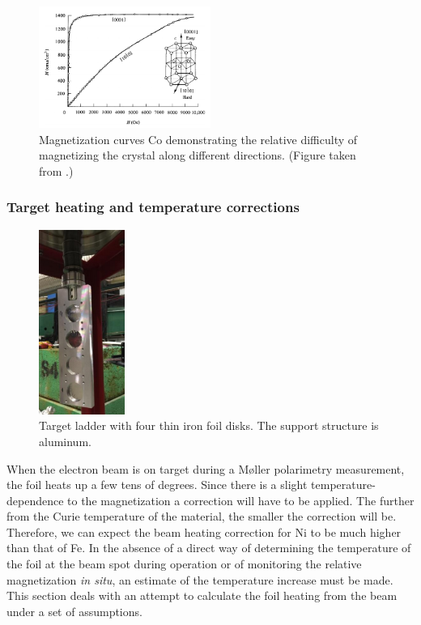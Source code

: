 \documentclass[12pt]{article}
\begin{document}
\begin{figure}[ht]
\centering
\includegraphics[width=0.5\textwidth]{anisotropy_Co.png}
\caption{Magnetization curves Co demonstrating the relative difficulty of magnetizing the crystal along different directions. (Figure taken from \cite{Cullity2008}.)}
\label{fig:anisotropy_Co}
\end{figure}
\FloatBarrier
\subsubsection{\label{sec:target_heating}Target heating and temperature corrections}
\begin{figure}
\vspace{-20pt}
\centering
\includegraphics[width=0.25\textwidth]{target_ladder.png}
\caption{Target ladder with four thin iron foil disks. The support structure is aluminum.}
\label{fig:target_ladder}
\end{figure}
When the electron beam is on target during a M\o ller polarimetry measurement, the foil heats up a few tens of degrees. Since there is a slight temperature-dependence to the magnetization a correction will have to be applied. The further from the Curie temperature of the material, the smaller the correction will be. Therefore, we can expect the beam heating correction for Ni to be much higher than that of Fe. In the absence of a direct way of determining the temperature of the foil at the beam spot during operation or of monitoring the relative magnetization {\it in situ}, an estimate of the temperature increase must be made. This section deals with an attempt to calculate the foil heating from the beam under a set of assumptions.
\end{document}
